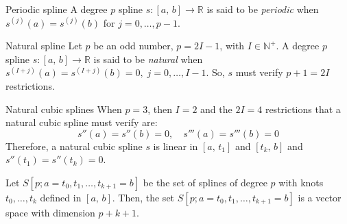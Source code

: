 \begin{definition}{Periodic spline}{}
    A degree $p$ spline $s: [a,\,b] \to \mathds R$ is said to be \emph{periodic} when
    $s^{(j)}(a) = s^{(j)}(b)$ for $j=0,\ldots,p-1$.
\end{definition}

\begin{definition}{Natural spline}{}
    Let $p$ be an odd number, $p = 2I - 1$, with $I \in \mathbb{N}^+$. A degree $p$ spline
    $s: [a,\,b] \to \mathds R$ is said to be \emph{natural} when
    $s^{(I+j)}(a) = s^{(I+j)}(b) = 0,\;j=0,\ldots,I-1$.
    \tcblower
    So, $s$ must verify $p+1 = 2I$ restrictions.
\end{definition}

\begin{example}{Natural cubic splines}{}
    When $p=3$, then $I=2$ and the $2I=4$ restrictions that a natural
    cubic spline must verify are:
    \begin{equation*}
        s''(a) = s''(b) = 0,\quad s'''(a) = s'''(b) = 0
    \end{equation*}
    \tcblower
    Therefore, a natural cubic spline $s$ is linear in $[a,\,t_1]$ and $[t_k,\,b]$
    and $s''(t_1) = s''(t_k) = 0$.
\end{example}

\begin{prop}{}{}
    Let $S[p;a=t_0,t_1,\ldots,t_{k+1}=b]$ be the set of splines of
    degree $p$ with knots $t_0,\ldots,t_{k}$ defined in $[a,\,b]$.
    Then, the set $S[p;a=t_0,t_1,\ldots,t_{k+1}=b]$ is a vector space
    with dimension $p+k+1$.
\end{prop}

